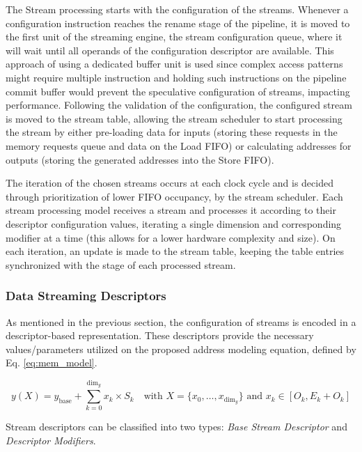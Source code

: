 The Stream processing starts with the configuration of the streams. Whenever a configuration instruction reaches the rename stage of the pipeline, it is moved to the first unit of the streaming engine, the stream configuration queue, where it will wait until all operands of the configuration descriptor are available. This approach of using a dedicated buffer unit is used since complex access patterns might require multiple instruction and holding such instructions on the pipeline commit buffer would prevent the speculative configuration of streams, impacting performance. Following the validation of the configuration, the configured stream is moved to the stream table, allowing the stream scheduler to start processing the stream by either pre-loading data for inputs (storing these requests in the memory requests queue and data on the Load FIFO) or calculating addresses for outputs (storing the generated addresses into the Store FIFO). 

The iteration of the chosen streams occurs at each clock cycle and is decided through prioritization of lower FIFO occupancy, by the stream scheduler. Each stream processing model receives a stream and processes it according to their descriptor configuration values, iterating a single dimension and corresponding modifier at a time (this allows for a lower hardware complexity and size).  On each iteration, an update is made to the stream table, keeping the table entries synchronized with the stage of each processed stream. 


\subsubsection{Data Streaming Descriptors}

As mentioned in the previous section, the configuration of streams is encoded in a descriptor-based representation. These descriptors provide the necessary values/parameters utilized on the proposed address modeling equation, defined by Eq. \ref{eq:mem_model}. 

\begin{equation}
    y(X) = y_{\text{base}} + \sum_{k=0}^{\text{dim}_y} x_k \times S_k
    \quad \text{with } X = \{x_0, \ldots, x_{\text{dim}_y}\} \text{ and } x_k \in [O_k, E_k+O_k]
    \label{eq:mem_model}
\end{equation}

Stream descriptors can be classified into two types: \textit{Base Stream Descriptor} and \textit{Descriptor Modifiers}.

